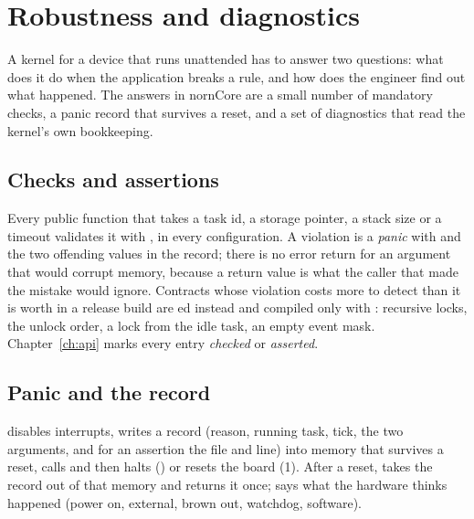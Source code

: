 \chapter{Robustness and diagnostics}
\label{ch:robust}

A kernel for a device that runs unattended has to answer two questions: what does it do
when the application breaks a rule, and how does the engineer find out what happened. The
answers in nornCore are a small number of mandatory checks, a panic record that survives
a reset, and a set of diagnostics that read the kernel's own bookkeeping.

\section{Checks and assertions}

Every public function that takes a task id, a storage pointer, a stack size or a timeout
validates it with , in every configuration. A violation is a
\emph{panic} with  and the two offending values in the record;
there is no error return for an argument that would corrupt memory, because a return
value is what the caller that made the mistake would ignore. Contracts whose violation
costs more to detect than it is worth in a release build are ed
instead and compiled only with : recursive locks, the unlock
order, a lock from the idle task, an empty event mask. Chapter~\ref{ch:api} marks every
entry \emph{checked} or \emph{asserted}.

\section{Panic and the record}

 disables interrupts, writes a record (reason,
running task, tick, the two arguments, and for an assertion the file and line) into
memory that survives a reset, calls  and then halts
() or resets the board (1). After a reset,
 takes the record out of that memory and 
returns it once;  says what the hardware thinks happened
(power on, external, brown out, watchdog, software).

